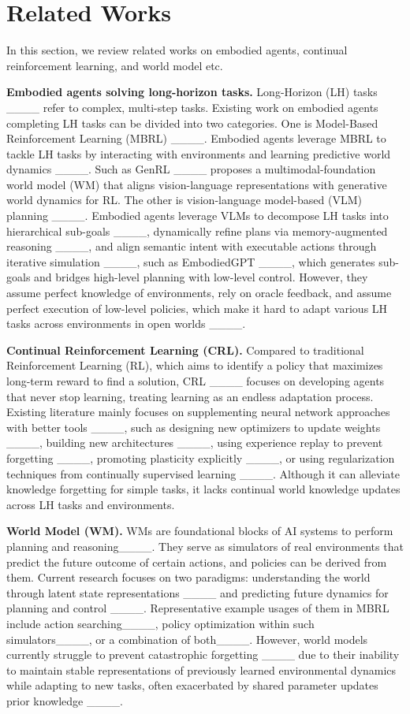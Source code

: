 \section{Related Works}
In this section, we review related works on embodied agents, continual reinforcement learning, and world model etc.

{\bf Embodied agents solving long-horizon tasks.} Long-Horizon (LH) tasks ____ refer to complex, multi-step tasks. Existing work on embodied agents completing LH tasks can be divided into two categories. One is Model-Based Reinforcement Learning (MBRL) ____. Embodied agents leverage MBRL to tackle LH tasks by interacting with environments and learning predictive world dynamics ____. Such as GenRL ____ proposes a multimodal-foundation world model (WM) that aligns vision-language representations with generative world dynamics for RL. The other is vision-language model-based (VLM) planning ____. Embodied agents leverage VLMs to decompose LH tasks into hierarchical sub-goals ____, dynamically refine plans via memory-augmented reasoning ____, and align semantic intent with executable actions through iterative simulation ____, such as EmbodiedGPT ____, which generates sub-goals and bridges high-level planning with low-level control. However, they assume perfect knowledge of environments, rely on oracle feedback, and assume perfect execution of low-level policies, which make it hard to adapt various LH tasks across environments in open worlds ____.

{\bf Continual Reinforcement Learning (CRL).} Compared to traditional Reinforcement Learning (RL), which aims to identify a policy that maximizes long-term reward to find a solution, CRL ____ focuses on developing agents that never stop learning, treating learning as an endless adaptation process. Existing literature mainly focuses on supplementing neural network approaches with better tools ____, such as designing new optimizers to update weights ____, building new architectures ____, using experience replay to prevent forgetting ____, promoting plasticity explicitly ____, or using regularization techniques from continually supervised learning ____. Although it can alleviate knowledge forgetting for simple tasks, it lacks continual world knowledge updates across LH tasks and environments.

{\bf World Model (WM).} WMs are foundational blocks of AI systems to perform planning and reasoning____. They serve as simulators of real environments that predict the future outcome of certain actions, and policies can be derived from them. Current research focuses on two paradigms: understanding the world through latent state representations ____ and predicting future dynamics for planning and control ____. Representative example usages of them in MBRL include action searching____, policy optimization within such simulators____, or a combination of both____. However, world models currently struggle to prevent catastrophic forgetting ____ due to their inability to maintain stable representations of previously learned environmental dynamics while adapting to new tasks, often exacerbated by shared parameter updates prior knowledge ____.